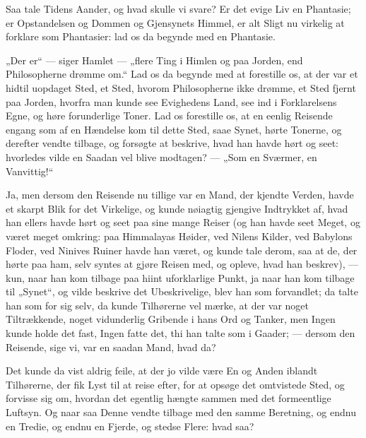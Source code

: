 \documentclass[12pt,a4paper]{book}
\newcommand{\apage}[1]{\marginnote{\footnotesize\textit{[#1]}}}
\begin{document}
Saa tale Tidens Aander, og hvad skulle vi svare? Er det evige Liv en Phantasie; er Opstandelsen og Dommen og \apage{3}
Gjensynets Himmel, er alt Sligt nu virkelig at forklare som Phantasier: lad os da begynde med en Phantasie.

„Der er“ --- siger Hamlet --- „flere Ting i Himlen og paa Jorden, end Philosopherne drømme om.“ Lad os da begynde med at forestille os, at der var et hidtil uopdaget Sted, et Sted, hvorom Philosopherne ikke drømme, et Sted fjernt paa Jorden, hvorfra man kunde see Evighedens Land, see ind i Forklarelsens Egne, og høre forunderlige Toner. Lad os forestille os, at en eenlig Reisende engang som af en Hændelse kom til dette Sted, saae Synet, hørte Tonerne, og derefter vendte tilbage, og forsøgte at beskrive, hvad han havde hørt og seet: hvorledes vilde en Saadan vel blive modtagen? --- „Som en Sværmer, en Vanvittig!“

Ja, men dersom den Reisende nu tillige var en Mand, der kjendte Verden, havde et skarpt Blik for det Virkelige, og kunde nøiagtig gjengive Indtrykket af, hvad han ellers havde hørt og seet paa sine mange Reiser (og han havde seet Meget, og været meget omkring: paa Himmalayas Høider, ved Nilens Kilder, ved Babylons Floder, ved Ninives Ruiner havde han været, og kunde tale derom, saa at de, der hørte paa ham, selv syntes at gjøre Reisen med, og opleve, hvad han beskrev), --- kun, naar han kom tilbage paa hiint uforklarlige Punkt, ja naar han kom tilbage til „Synet“, og vilde beskrive det Ubeskrivelige, blev han som forvandlet; da talte han som for sig selv, da kunde Tilhørerne vel mærke, at der var noget Tiltrækkende, noget vidunderlig Gribende i hans Ord og Tanker, men Ingen kunde holde det fast, Ingen fatte det, thi han talte som i Gaader; --- dersom den Reisende, sige vi, var en saadan Mand, hvad da?

Det kunde da vist aldrig feile, at der jo vilde være En og Anden iblandt Tilhørerne, der fik Lyst til at reise efter, for at opsøge det omtvistede Sted, og forvisse sig om, hvordan det egentlig hængte sammen med det formeentlige Luftsyn. Og naar saa Denne vendte tilbage med den samme Beretning,
og \apage{4} endnu en Tredie, og endnu en Fjerde, og stedse Flere: hvad saa?
\end{document}
